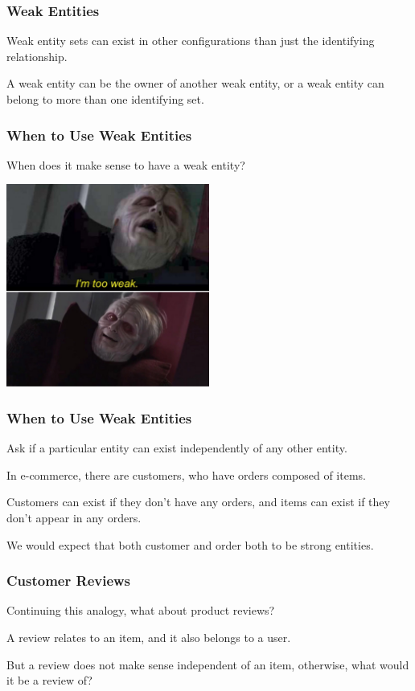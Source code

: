 \begin{frame}
\frametitle{Weak Entities}

Weak entity sets can exist in other configurations than just the identifying relationship. 

A weak entity can be the owner of another weak entity, or a weak entity can belong to more than one identifying set.

\end{frame}


\begin{frame}
\frametitle{When to Use Weak Entities}

When does it make sense to have a weak entity? 

\begin{center}
	\includegraphics[width=0.5\textwidth]{images/weak.jpg}
\end{center}

\end{frame}


\begin{frame}
\frametitle{When to Use Weak Entities}


Ask if a particular entity can exist independently of any other entity. 

In e-commerce, there are customers, who have orders composed of items. 

Customers can exist if they don't have any orders, and items can exist if they don't appear in any orders. 

We would expect that both customer and order both to be strong entities.

\end{frame}



\begin{frame}
\frametitle{Customer Reviews}

Continuing this analogy, what about product reviews? 

A review relates to an item, and it also belongs to a user. 

But a review does not make sense independent of an item, otherwise, what would it be a review of? 

\end{frame}



